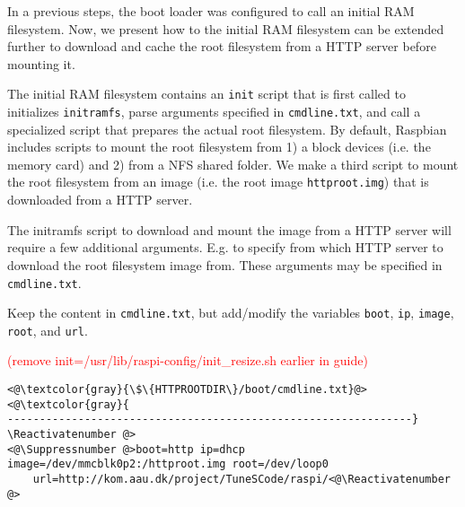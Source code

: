 In a previous steps, the boot loader was configured to call an initial \ac{RAM}
filesystem. Now, we present how to the initial \ac{RAM}
filesystem can be extended further to download and cache the root filesystem
from a \ac{HTTP} server before mounting it.

The initial \ac{RAM} filesystem contains an \texttt{init} script that
is first called to initializes
\texttt{initramfs}, parse arguments specified in \texttt{cmdline.txt}, and
call a specialized script that prepares the actual root filesystem. By default,
Raspbian includes scripts to mount the root filesystem from 1) a block devices
(i.e. the memory card) and 2) from a \ac{NFS} shared folder. We make a third
script to mount the root filesystem from an image
(i.e. the root image \texttt{httproot.img}) that is downloaded from a
\ac{HTTP} server.

The initramfs script to download and mount the image from a \ac{HTTP} server
will require a few additional arguments. E.g. to specify from which \ac{HTTP}
server to download the root filesystem image from.
These arguments
may be specified in \texttt{cmdline.txt}.

Keep the content in \texttt{cmdline.txt}, but add/modify the variables
\texttt{boot}, \texttt{ip}, \texttt{image}, \texttt{root}, and \texttt{url}.


\textcolor{red}{(remove init=/usr/lib/raspi-config/init\_resize.sh earlier in guide)}
\Suppressnumber\begin{lstlisting}[]
<@\textcolor{gray}{\$\{HTTPROOTDIR\}/boot/cmdline.txt}@>
<@\textcolor{gray}{
---------------------------------------------------------------}
\Reactivatenumber @>
<@\Suppressnumber @>boot=http ip=dhcp image=/dev/mmcblk0p2:/httproot.img root=/dev/loop0
    url=http://kom.aau.dk/project/TuneSCode/raspi/<@\Reactivatenumber @>
\end{lstlisting}
\FloatBarrier
\vspace{-5mm}

